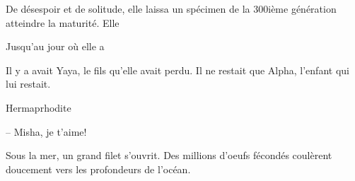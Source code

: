 De désespoir et de solitude, elle laissa un spécimen de la 300ième génération atteindre la maturité.
Elle 

Jusqu'au jour où elle a 

Il y a avait Yaya, le fils qu'elle avait perdu.
Il ne restait que Alpha, l'enfant qui lui restait.

\sautSection{}

Hermaprhodite

\sautSection{}

-- Misha, je t'aime!

Sous la mer, un grand filet s'ouvrit. Des millions d'oeufs fécondés coulèrent
doucement vers les profondeurs de l'océan.


